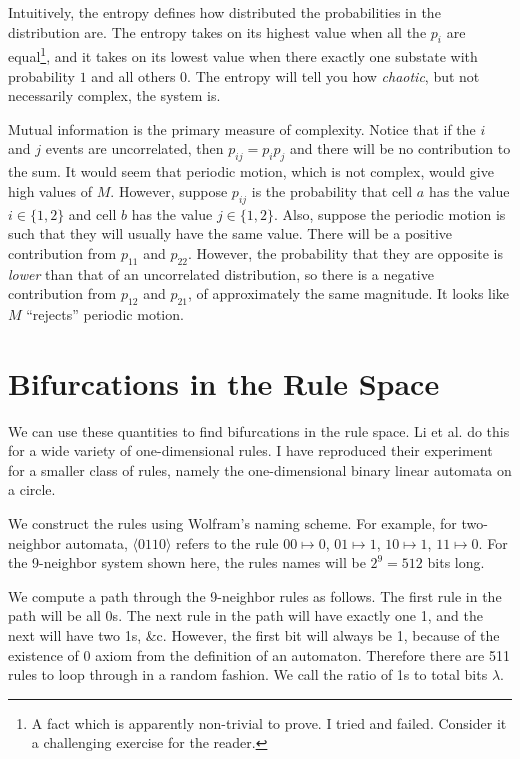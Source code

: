 \documentclass[12pt]{article}
\begin{document}
Intuitively, the entropy defines how distributed the probabilities in
the distribution are.  The entropy takes on its highest value when all
the $p_i$ are equal\footnote{A fact which is apparently non-trivial to
prove.  I tried and failed.  Consider it a challenging exercise for the
reader.}, and it takes on its lowest value when there exactly one
substate with probability $1$ and all others $0$.  The entropy will tell
you how \textit{chaotic}, but not necessarily complex, the system is.

Mutual information is the primary measure of complexity.  Notice that if
the $i$ and $j$ events are uncorrelated, then $p_{ij} = p_i p_j$ and
there will be no contribution to the sum.  It would seem that periodic
motion, which is not complex, would give high values of $M$.  However,
suppose $p_{ij}$ is the probability that cell $a$ has the value $i \in
\{1,2\}$ and cell $b$ has the value $j \in \{1,2\}$.  Also, suppose the
periodic motion is such that they will usually have the same value.
There will be a positive contribution from $p_{11}$ and $p_{22}$.
However, the probability that they are opposite is \textit{lower} than
that of an uncorrelated distribution, so there is a negative
contribution from $p_{12}$ and $p_{21}$, of approximately the same
magnitude.  It looks like $M$ ``rejects'' periodic motion.

\section{Bifurcations in the Rule Space}

We can use these quantities to find bifurcations in the rule space.  Li
et al. \cite{Li-1990} do this for a wide variety of one-dimensional
rules.  I have reproduced their experiment for a smaller class of rules,
namely the one-dimensional binary linear automata on a circle.  

We construct the rules using Wolfram's naming scheme.  For example, for
two-neighbor automata, $\langle 0110 \rangle$ refers to the rule $00
\mapsto 0$, $01 \mapsto 1$, $10 \mapsto 1$, $11 \mapsto 0$.   For the
9-neighbor system shown here, the rules names will be $2^9 = 512$ bits
long.

We compute a path through the 9-neighbor rules as follows.  The first
rule in the path will be all 0s.  The next rule in the path will have
exactly one 1, and the next will have two 1s, \&c.  However, the first
bit will always be 1, because of the existence of 0 axiom from the
definition of an automaton.  Therefore there are 511 rules to loop
through in a random fashion.  We call the ratio of 1s to total bits
$\lambda$.
\end{document}
